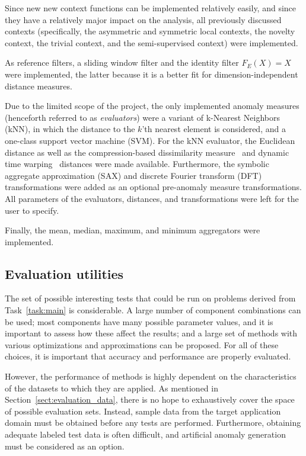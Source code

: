 Since new new context functions can be implemented relatively easily, and since they have a relatively major impact on the analysis, all previously discussed contexts (specifically, the asymmetric and symmetric local contexts, the novelty context, the trivial context, and the semi-supervised context) were implemented.

As reference filters, a sliding window filter and the identity filter $F_E(X)=X$ were implemented, the latter because it is a better fit for dimension-independent distance measures.

Due to the limited scope of the project, the only implemented anomaly measures (henceforth referred to as \emph{evaluators}) were a variant of k-Nearest Neighbors (kNN), in which the distance to the $k$'th nearest element is considered, and a one-class support vector machine (SVM). For the kNN evaluator, the Euclidean distance as well as the compression-based dissimilarity measure~\cite{keogh2} and dynamic time warping~\cite{dtw} distances were made available. Furthermore, the symbolic aggregate approximation (SAX) and discrete Fourier transform (DFT) transformations were added as an optional pre-anomaly measure transformations. All parameters of the evaluators, distances, and transformations were left for the user to specify.

Finally, the mean, median, maximum, and minimum aggregators were implemented.

\subsection{Evaluation utilities}
\label{sect:evaluation_package}

The set of possible interesting tests that could be run on problems derived from Task~\ref{task:main} is considerable. A large number of component combinations can be used; most components have many possible parameter values, and it is important to assess how these affect the results; and a large set of methods with various optimizations and approximations can be proposed. For all of these choices, it is important that accuracy and performance are properly evaluated.

However, the performance of methods is highly dependent on the characteristics of the datasets to which they are applied. As mentioned in Section~\ref{sect:evaluation_data}, there is no hope to exhaustively cover the space of possible evaluation sets. Instead, sample data from the target application domain must be obtained before any tests are performed. Furthermore, obtaining adequate labeled test data is often difficult, and artificial anomaly generation must be considered as an option.

